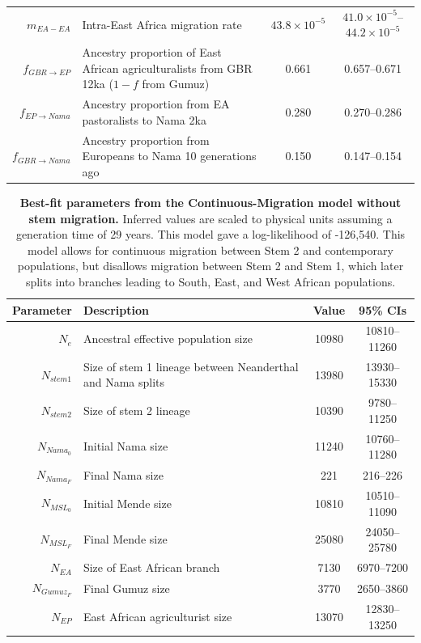 \documentclass[]{article}
\begin{document}
\begin{table}[ht]
\begin{tabular}[t]{rP{8cm}cc}
    $m_{EA-EA}$ & Intra-East Africa migration rate & $43.8\times10^{-5}$ & $41.0\times10^{-5}$--$44.2\times10^{-5}$ \\
    $f_{GBR \rightarrow EP}$ & Ancestry proportion of East African agriculturalists from GBR 12ka ($1-f$ from Gumuz) & 0.661 & 0.657--0.671 \\
    $f_{EP \rightarrow Nama}$ & Ancestry proportion from EA pastoralists to Nama 2ka & 0.280 & 0.270--0.286 \\
    $f_{GBR \rightarrow Nama}$ & Ancestry proportion from Europeans to Nama 10 generations ago & 0.150 & 0.147--0.154 \\
    \bottomrule
\end{tabular}
\end{table}

\begin{table}[ht]
\caption{
    \label{tab:supp-continuous-migration-no-mig}
    \textbf{Best-fit parameters from the Continuous-Migration model without stem migration.}
    Inferred values are scaled to physical units assuming a generation time of
    29 years. This model gave a log-likelihood of -126,540. This model allows for
    continuous migration between Stem 2 and contemporary populations, but disallows
    migration between Stem 2 and Stem 1, which later splits into branches leading
    to South, East, and West African populations.
}
\centering
\begin{tabular}[t]{rP{8cm}cc}
    \toprule
    Parameter & Description & Value & 95\% CIs \\
    \midrule
    $N_e$ & Ancestral effective population size & 10980 & 10810--11260 \\
    $N_{stem1}$ & Size of stem 1 lineage between Neanderthal and Nama splits & 13980 & 13930--15330 \\
    $N_{stem2}$ & Size of stem 2 lineage & 10390 & 9780--11250 \\
    $N_{Nama_0}$ & Initial Nama size & 11240 & 10760--11280 \\
    $N_{Nama_F}$ & Final Nama size & 221 & 216--226 \\
    $N_{MSL_0}$ & Initial Mende size & 10810 & 10510--11090 \\
    $N_{MSL_F}$ & Final Mende size & 25080 & 24050--25780 \\
    $N_{EA}$ & Size of East African branch & 7130 & 6970--7200 \\
    $N_{Gumuz_F}$ & Final Gumuz size & 3770 & 2650--3860 \\
    $N_{EP}$ & East African agriculturist size & 13070 & 12830--13250 \\

\end{tabular}
\end{table}
\end{document}
